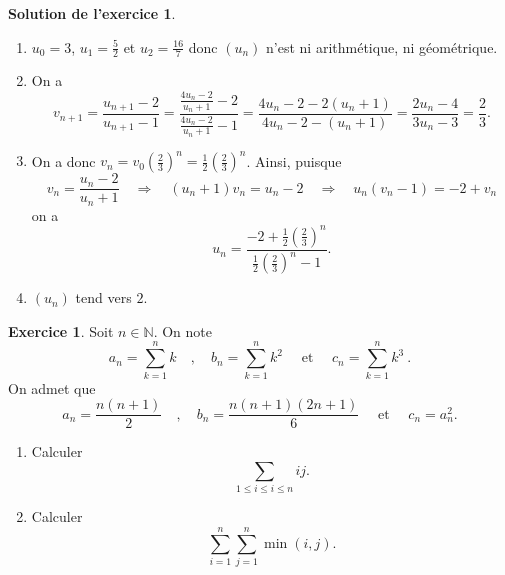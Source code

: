 \documentclass[a4paper, 11pt,openany]{article}%
\theoremstyle{plain}
\theoremstyle{definition}
\newtheorem{exo}{Exercice}
\newtheorem{sol}{Solution de l'exercice}
\theoremstyle{remark}
\newcommand{\N}{\mathbb{N}}
\begin{document}
\begin{sol}
\begin{enumerate}
\item $u_0=3$, $u_1 = \frac{5}{2}$ et $u_2= \frac{16}{7}$ donc $(u_n)$ n'est ni arithmétique, ni géométrique.
\item On a
\[ v_{n+1} = \frac{u_{n+1} -2}{u_{n+1} - 1} = \frac{\frac{4 u_n - 2}{u_n+1} -2}{\frac{4 u_n - 2}{u_n+1} - 1} = \frac{4 u_n - 2 -2(u_n+1)}{4 u_n - 2 - (u_n+1)} =  \frac{2 u_n - 4}{3 u_n - 3} = \frac{2}{3}.\]
\item On a donc $v_n = v_0 \left( \frac{2}{3} \right)^n = \frac{1}{2} \left( \frac{2}{3} \right)^n$. Ainsi, puisque
\[ v_n = \frac{u_n-2}{u_n+1} \quad \Rightarrow \quad (u_n +1 ) v_n = u_n - 2 
 \quad \Rightarrow \quad u_n( v_n - 1) = -2 + v_n\]
 on a
 \[ u_n= \frac{ -2 + \frac{1}{2} \left( \frac{2}{3} \right)^n}{\frac{1}{2} \left( \frac{2}{3} \right)^n - 1 }.\]
\item $(u_n)$ tend vers $2$.
\end{enumerate}
\end{sol}


\begin{exo}
	Soit $n\in \N$. On note  
	\[
		a_n = \sum_{k=1}^n k
		\quad , \quad 
		b_n = \sum_{k=1}^n k^2
		\quad \mbox{ et }\quad 
		c_n = \sum_{k=1}^n k^3 \ .
	\]
	On admet que
		\[
		a_n = \frac{n(n+1)}{2}
		\quad , \quad 
		b_n = \frac{n(n+1)(2n+1)}{6}
		\quad \mbox{ et }\quad 
		c_n = a_n^2 .
	\]
	\begin{enumerate}
		\item Calculer $$\sum_{1\leqslant i \leqslant i \leqslant n} ij.$$		
		\item Calculer $$ \sum_{i=1}^n \sum_{j=1}^n \min(i,j).$$
	\end{enumerate}
\end{exo}
\end{document}
